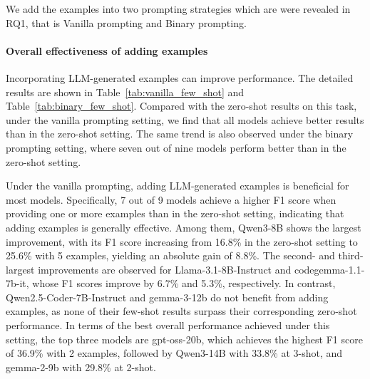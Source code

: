 \documentclass[acmsmall,screen,review,anonymous]{acmart}
\begin{document}
We add the examples into two prompting strategies which are  were revealed in RQ1, that is Vanilla prompting and Binary prompting.

\paragraph{Overall effectiveness of adding examples}



Incorporating LLM-generated examples can improve performance. The detailed results are shown in Table~\ref{tab:vanilla_few_shot} and Table~\ref{tab:binary_few_shot}. Compared with the zero-shot results on this task, under the vanilla prompting setting, we find that all models achieve better results than in the zero-shot setting. The same trend is also observed under the binary prompting setting, where seven out of nine models perform better than in the zero-shot setting.



Under the vanilla prompting, adding LLM-generated examples is beneficial for most models. Specifically, 7 out of 9 models achieve a higher F1 score when providing one or more examples than in the zero-shot setting, indicating that adding examples is generally effective. Among them, Qwen3-8B shows the largest improvement, with its F1 score increasing from 16.8\% in the zero-shot setting to 25.6\% with 5 examples, yielding an absolute gain of 8.8\%. The second- and third-largest improvements are observed for Llama-3.1-8B-Instruct and codegemma-1.1-7b-it, whose F1 scores improve by 6.7\% and 5.3\%, respectively. In contrast, Qwen2.5-Coder-7B-Instruct and gemma-3-12b do not benefit from adding examples, as none of their few-shot results surpass their corresponding zero-shot performance. In terms of the best overall performance achieved under this setting, the top three models are gpt-oss-20b, which achieves the highest F1 score of 36.9\% with 2 examples, followed by Qwen3-14B with 33.8\% at 3-shot, and gemma-2-9b with 29.8\% at 2-shot.






\end{document}
